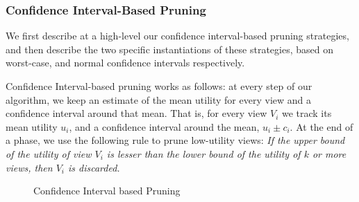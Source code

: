 \subsubsection{Confidence Interval-Based Pruning}
\label{sec:confidence_interval}
We first describe at a high-level our confidence interval-based pruning strategies,
and then describe the two specific instantiations of these strategies,
based on worst-case, and normal confidence intervals respectively.

Confidence Interval-based pruning works as follows: at every step of our
algorithm, we keep an estimate of the mean utility for every view and a
confidence interval around that mean.
That is, for every view $V_i$ we track its mean utility $u_i$, and a
confidence interval around the mean, $u_i \pm c_i$.
At the end of a phase, we use the following rule to prune low-utility
views:
{\em If the upper bound of the utility of view $V_i$ is lesser
than the lower bound of the utility of $k$ or more views, then $V_i$ is discarded.}

\begin{figure}[h]
\vspace{-10pt}
\centerline{
\hbox{}}
\vspace{-20pt}
\caption{Confidence Interval based Pruning}
\label{fig:conf_interval}
\vspace{-12pt}
\end{figure}

